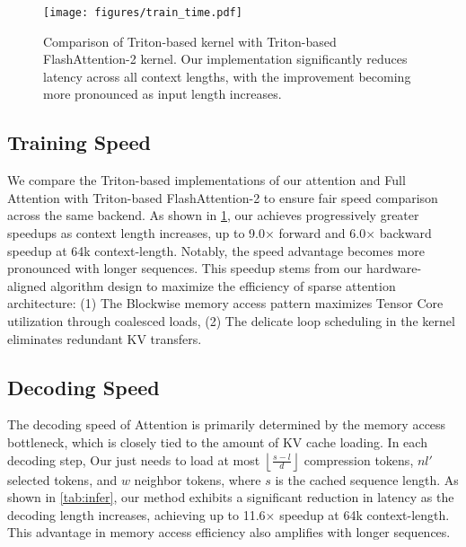\begin{figure}[t]
    \centering
    \texttt{[image: figures/train\_time.pdf]}
    \caption{Comparison of Triton-based \method{} kernel with Triton-based FlashAttention-2 kernel. Our implementation significantly reduces latency across all context lengths, with the improvement becoming more pronounced as input length increases.}
    \label{fig:speed}
\end{figure}
\subsection{Training Speed}
We compare the Triton-based implementations of our \method{} attention and Full Attention with Triton-based FlashAttention-2 to ensure fair speed comparison across the same backend.
As shown in \cref{fig:speed}, our \method{} achieves progressively greater speedups as context length increases, up to 9.0$\times$ forward and 6.0$\times$ backward speedup at 64k context-length. Notably, the speed advantage becomes more pronounced with longer sequences. This speedup stems from our hardware-aligned algorithm design to maximize the efficiency of sparse attention architecture: (1) The Blockwise memory access pattern maximizes Tensor Core utilization through coalesced loads, (2) The 
delicate loop scheduling in the kernel eliminates redundant KV transfers.


\subsection{Decoding Speed}
The decoding speed of Attention is primarily determined by the memory access bottleneck, which is closely tied to the amount of KV cache loading. In each decoding step, Our \method{} just needs to load at most $\left\lfloor\frac{s-l}{d}\right\rfloor$ compression tokens, $nl'$ selected tokens, and $w$ neighbor tokens, where $s$ is the cached sequence length.
As shown in \cref{tab:infer}, our method exhibits a significant reduction in latency as the decoding length increases, achieving up to 11.6$\times$ speedup at 64k context-length. This advantage in memory access efficiency also amplifies with longer sequences.
